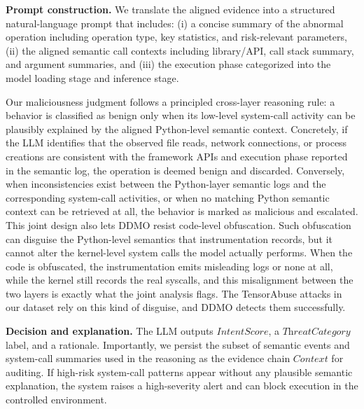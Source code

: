 \noindent \textbf{Prompt construction.}
We translate the aligned evidence into a structured natural-language prompt that includes: (i) a concise summary of the abnormal operation including operation type, key statistics, and risk-relevant parameters, (ii) the aligned semantic call contexts including library/API, call stack summary, and argument summaries, and (iii) the execution phase categorized into the model loading stage and inference stage.

Our maliciousness judgment follows a principled cross-layer reasoning rule: a behavior is classified as benign only when its low-level system-call activity can be plausibly explained by the aligned Python-level semantic context. Concretely, if the LLM identifies that the observed file reads, network connections, or process creations are consistent with the framework APIs and execution phase reported in the semantic log, the operation is deemed benign and discarded. Conversely, when inconsistencies exist between the Python-layer semantic logs and the corresponding system-call activities, or when no matching Python semantic context can be retrieved at all, the behavior is marked as malicious and escalated. This joint design also lets DDMO resist code-level obfuscation. Such obfuscation can disguise the Python-level semantics that instrumentation records, but it cannot alter the kernel-level system calls the model actually performs. When the code is obfuscated, the instrumentation emits misleading logs or none at all, while the kernel still records the real syscalls, and this misalignment between the two layers is exactly what the joint analysis flags. The TensorAbuse attacks in our dataset rely on this kind of disguise, and DDMO detects them successfully.

\noindent \textbf{Decision and explanation.}
The LLM outputs $\textit{IntentScore}$, a $\textit{ThreatCategory}$ label, and a rationale. Importantly, we persist the subset of semantic events and system-call summaries used in the reasoning as the evidence chain $\textit{Context}$ for auditing.
If high-risk system-call patterns appear without any plausible semantic explanation, the system raises a high-severity alert and can block execution in the controlled environment.


